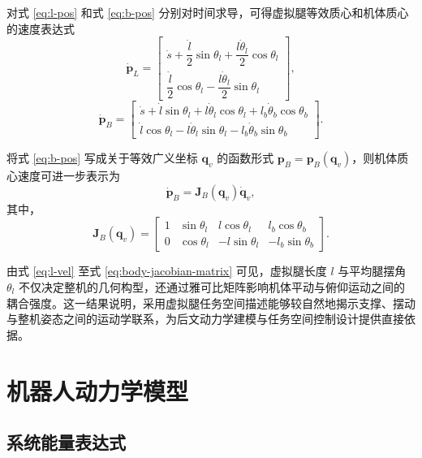 对式 \eqref{eq:l-pos} 和式 \eqref{eq:b-pos} 分别对时间求导，可得虚拟腿等效质心和机体质心的速度表达式
\begin{equation}
  \dot{\boldsymbol{p}}_L =
  \begin{bmatrix}
    \dot{s} + \dfrac{\dot{l}}{2}\sin\theta_l + \dfrac{l\dot{\theta}_l}{2}\cos\theta_l \\
    \dfrac{\dot{l}}{2}\cos\theta_l - \dfrac{l\dot{\theta}_l}{2}\sin\theta_l
  \end{bmatrix},
  \label{eq:l-vel}
\end{equation}
\begin{equation}
  \dot{\boldsymbol{p}}_B =
  \begin{bmatrix}
    \dot{s} + \dot{l}\sin\theta_l + l\dot{\theta}_l\cos\theta_l + l_b\dot{\theta}_b\cos\theta_b \\
    \dot{l}\cos\theta_l - l\dot{\theta}_l\sin\theta_l - l_b\dot{\theta}_b\sin\theta_b
  \end{bmatrix}.
  \label{eq:b-vel}
\end{equation}

将式 \eqref{eq:b-pos} 写成关于等效广义坐标 $\boldsymbol{q}_v$ 的函数形式 $\boldsymbol{p}_B = \boldsymbol{p}_B(\boldsymbol{q}_v)$，则机体质心速度可进一步表示为
\begin{equation}
  \dot{\boldsymbol{p}}_B = \boldsymbol{J}_B(\boldsymbol{q}_v)\dot{\boldsymbol{q}}_v,
  \label{eq:body-jacobian}
\end{equation}
其中，
\begin{equation}
  \boldsymbol{J}_B(\boldsymbol{q}_v) =
  \begin{bmatrix}
    1 & \sin\theta_l & l\cos\theta_l & l_b\cos\theta_b \\
    0 & \cos\theta_l & -l\sin\theta_l & -l_b\sin\theta_b
  \end{bmatrix}.
  \label{eq:body-jacobian-matrix}
\end{equation}

由式 \eqref{eq:l-vel} 至式 \eqref{eq:body-jacobian-matrix} 可见，虚拟腿长度 $l$ 与平均腿摆角 $\theta_l$ 不仅决定整机的几何构型，还通过雅可比矩阵影响机体平动与俯仰运动之间的耦合强度。这一结果说明，采用虚拟腿任务空间描述能够较自然地揭示支撑、摆动与整机姿态之间的运动学联系，为后文动力学建模与任务空间控制设计提供直接依据。

\section{机器人动力学模型}

\subsection{系统能量表达式}


